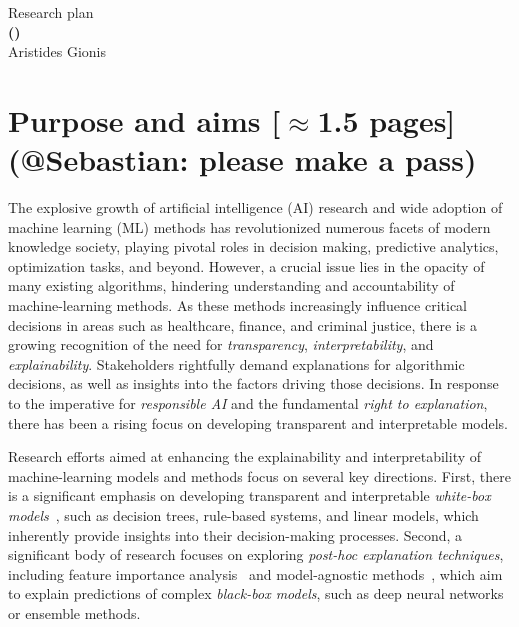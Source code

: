 \documentclass[a4paper,11pt]{article}
\begin{document}
\begin{center} 
{\Large Research plan} \vspace{3mm}\\
{\Large\bf {\proposaltitle} {\sc (}{\acronymtitle}{\sc )}}  \vspace{3mm} \\
{\Large Aristides Gionis} 
\end{center}


\section{Purpose and aims {\color{orange}[$\approx$1.5 pages]} {\color{teal}(@Sebastian: please make a pass)}}


The explosive growth of artificial intelligence (AI) research and wide adoption of machine learning (ML) methods 
has revolutionized numerous facets of modern knowledge society, 
playing pivotal roles in decision making, predictive analytics, optimization tasks, and beyond. 
However, a crucial issue lies in the opacity of many existing algorithms, 
hindering understanding and accountability of machine-learning methods. 
As these methods increasingly influence critical decisions in areas such as 
healthcare, finance, and criminal justice, 
there is a growing recognition of the need for \emph{transparency}, 
\emph{interpretability}, and \emph{explainability}.
Stakeholders rightfully demand explanations for algorithmic decisions, 
as well as insights into the factors driving those decisions. 
In response to the imperative for \emph{responsible AI} and the fundamental \emph{right to explanation}, 
there has been a rising focus on developing transparent and interpretable models.

Research efforts aimed at enhancing the explainability and interpretability 
of machine-learning models and methods focus on several key directions. 
First, there is a significant emphasis on developing transparent and interpretable 
\emph{white-box models}~\cite{loyola2019black}, 
such as decision trees, rule-based systems, and linear models, 
which inherently provide insights into their decision-making processes. 
Second, a significant body of research focuses on exploring \emph{post-hoc explanation techniques}, 
including feature importance analysis~\cite{lundberg2017unified} and 
model-agnostic methods~\cite{ribeiro2016model}, 
which aim to explain predictions of complex \emph{black-box models}, 
such as deep neural networks or ensemble methods.
\end{document}
